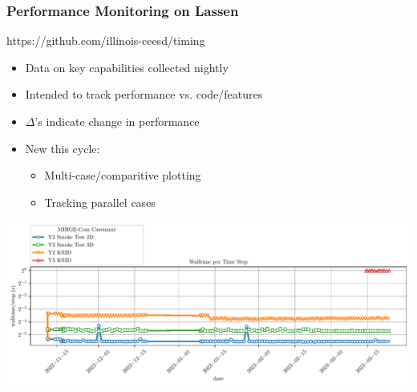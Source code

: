 \begin{frame}\frametitle{Performance Monitoring on Lassen}
\begin{minipage}[t][0.3\textheight][t]{\textwidth}
\begin{center}
https://github.com/illinois-ceesd/timing
\end{center}
\begin{multicols}{2}
\begin{itemize}
\item Data on key capabilities collected nightly
\item Intended to track performance vs. code/features
\item $\Delta$'s indicate change in performance
\columnbreak
\item New this cycle:
\begin{itemize}
\item Multi-case/comparitive plotting
\item Tracking parallel cases
\end{itemize}
\end{itemize}
\end{multicols}
\end{minipage}\vfill
\begin{center}
  \includegraphics[width=.8\textwidth]{Figures/mtc/multicase_step.pdf}
\end{center}
\end{frame}

